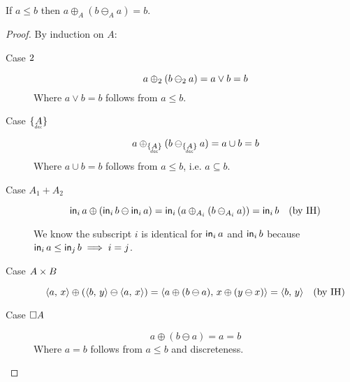 \documentclass{rntz}
\begin{document}


\begin{lemma}
  \label{lemma:oplus-ominus}
  \label{lemma:zero-id}
  If $a \le b$ then $a \oplus_A (b \ominus_A a) = b$.
\end{lemma}

\begin{proof}
  By induction on $A$:
  \begin{description}
    \item[Case $2$]
      \begin{equation*}
      a \oplus_2 (b \ominus_2 a) = a \vee b = b
      \end{equation*}
      Where $a \vee b = b$ follows from $a \le b$.

    \item[Case $\Seteq{A}$]
      \begin{equation*}
        a \oplus_{\Seteq{A}} (b \ominus_{\Seteq{A}} a)
        = a \cup b
        = b
      \end{equation*}
      Where $a \cup b = b$ follows from $a \le b$, i.e. $a \subseteq b$.

    \item[Case $A_1 + A_2$]
      \begin{equation*}
        \mathsf{in}_{i}\,{a} \oplus (\mathsf{in}_{i}\,{b} \ominus \mathsf{in}_{i}\,{a})
        = \mathsf{in}_{i}\,{(a \oplus_{A_i} (b \ominus_{A_i} a))}
        = \mathsf{in}_{i}\,{b}  \quad\text{(by IH)}
      \end{equation*}

      We know the subscript $i$ is identical for $\mathsf{in}_{i}\,{a}$ and $\mathsf{in}_{i}\,{b}$
      because $\mathsf{in}_{i}\,{a} \le \mathsf{in}_{j}\,{b} \implies i = j$.

    \item[Case $A \times B$]
      \begin{equation*}
        \langle{{a},\,{x}}\rangle \oplus (\langle{{b},\,{y}}\rangle \ominus \langle{{a},\,{x}}\rangle)
        = \langle{{a \oplus (b \ominus a)},\,{x \oplus (y \ominus x)}}\rangle
        = \langle{{b},\,{y}}\rangle \quad\text{(by IH)}
      \end{equation*}

    \item[Case $\square{A}$]
      \begin{equation*}
        a \oplus (b \ominus a) = a = b
      \end{equation*}
      Where $a = b$ follows from $a \le b$ and discreteness.



\end{description}
\end{proof}
\end{document}
